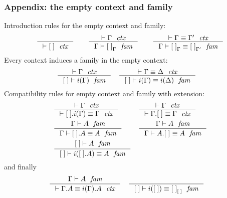 \documentclass{beamer}
\begin{document}
\begin{frame}
\frametitle{\bf Appendix: the empty context and family}
\begin{small}
Introduction rules for the empty context and family:
\begin{equation*}
\inference
  { }
  { \jctx{\emptyc}
    }
\qquad
\inference
  { \jctx{\Gamma}
    }
  { \jfam{\Gamma}{\emptyf[\Gamma]}
    }
\qquad
\inference
  { \jctxeq{\Gamma}{\Gamma'}
    }
  { \jfameq{\Gamma}{\emptyf[\Gamma]}{\emptyf[\Gamma']}
    }
\end{equation*}
\pause
Every context induces a family in the empty context:
\begin{align*}
& \inference
  { \jctx{\Gamma}
    }
  { \jfam{\emptyc}{i(\Gamma)}
    } 
  &
& \inference
  { \jctxeq{\Gamma}{\Delta}
    }
  { \jfameq{\emptyc}{i(\Gamma)}{i(\Delta)}
    }
\end{align*}
\pause
Compatibility rules for empty context and family with extension:
\begin{align*}
& \inference
  { \jctx{\Gamma}
    }
  { \jctxeq{\ctxext{\emptyc}{i(\Gamma)}}{\Gamma}
    }
& 
& \inference
  { \jctx{\Gamma}
    }
  { \jctxeq{\ctxext{\Gamma}{\emptyf}}{\Gamma}
    }
  \\
& \inference
  { \jfam{\Gamma}{A}
    }
  { \jfameq{\Gamma}{\ctxext{\emptyf}{A}}{A}
    }
&
& \inference
  { \jfam{\Gamma}{A}
    }
  { \jfameq{\Gamma}{{A}{\emptyf}}{A}
    }
  \\
& \inference
  { \jfam{\emptyc}{A}
    }
  { \jfameq{\emptyc}{i(\ctxext{\emptyc}{A})}{A}
    }
\end{align*}
\pause
and finally
\begin{align*}
& \inference
  { \jfam{\Gamma}{A}
    }
  { \jctxeq{\ctxext{\Gamma}{A}}{\ctxext{i(\Gamma)}{A}}
    }
& &
\inference
  { }
  { \jfameq{\emptyc}{i(\emptyc)}{\emptyf[\emptyc]}}
\end{align*}
\end{small}
\end{frame}
\end{document}
